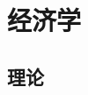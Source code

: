 \documentclass[UTF8]{RepresentationUniverse}
\begin{document}
\chapter{经济学}
\section{理论}
\end{document}
